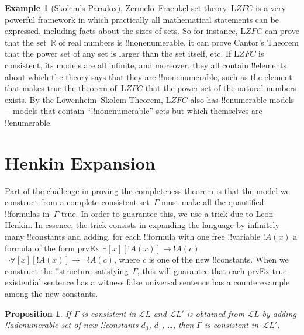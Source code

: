 \documentclass[10pt,a4paper]{article}
\theoremstyle{plain}
\newtheorem{prop}[thm]{Proposition}
\theoremstyle{definition}
\newtheorem{ex}[thm]{Example}
\theoremstyle{remark}
\newenvironment{explain}{}{}
\newcommand*{\olfileid}[3]{}
\newcommand*{\olsection}[1]{\section*{#1}}
\newcommand*{\ollabel}[1]{\label{#1}}
\providecommand{\lif}{\mathbin{\rightarrow}}
\providecommand{\lforall}{\mathord{\forall}}
\providecommand{\lexists}{\mathord{\exists}}
\providecommand{\Obj}{}
\providecommand{\Lang}{\ensuremath{\mathcal{L}}}
\providecommand{\Log}{\ensuremath{\mathrm{L}}}
\providecommand{\iftag}[1]{#1}
\providecommand{\Real}{\mathbb{R}}
\begin{document}
\begin{ex}[Skolem's Paradox]
Zermelo--Fraenkel set theory~$\Log{ZFC}$ is a very powerful framework
in which practically all mathematical statements can be expressed,
including facts about the sizes of sets. So for instance, $\Log{ZFC}$
can prove that the set~$\Real$ of real numbers is !!{nonenumerable},
it can prove Cantor's Theorem that the power set of any set is larger
than the set itself, etc.  If $\Log{ZFC}$ is consistent, its models
are all infinite, and moreover, they all contain !!{element}s about
which the theory says that they are !!{nonenumerable}, such as the
element that makes true the theorem of~$\Log{ZFC}$ that the power set
of the natural numbers exists. By the L\"owenheim--Skolem Theorem,
$\Log{ZFC}$ also has !!{enumerable} models---models that contain
``!!{nonenumerable}'' sets but which themselves are !!{enumerable}.
\end{ex}





\olfileid{fol}{com}{hen}

\olsection{Henkin Expansion}

\begin{explain}
Part of the challenge in proving the completeness theorem is that the
model we construct from a complete consistent set~$\Gamma$ must make
all the quantified !!{formula}s in~$\Gamma$ true.  In order to
guarantee this, we use a trick due to Leon Henkin.  In essence, the
trick consists in expanding the language by infinitely many !!{constant}s
and adding, for each !!{formula} with one free !!{variable} $!A(x)$ a
formula of the form
\iftag{prvEx}
      {$\lexists[x][!A(x)] \lif !A(c)$}
      {$\lnot\lforall[x][!A(x)] \lif \lnot !A(c)$},
where $c$ is one of the new !!{constant}s.  When we construct the
!!{structure} satisfying~$\Gamma$, this will guarantee that each
\iftag{prvEx}
{true existential sentence has a witness}
{false universal sentence has a counterexample}
among the new constants.
\end{explain}

\begin{prop}
\ollabel{prop:lang-exp}
If $\Gamma$ is consistent in $\Lang L$ and $\Lang L'$ is obtained from
$\Lang L$ by adding !!a{denumerable} set of new !!{constant}s $\Obj d_0$,
$\Obj d_1$, \dots, then $\Gamma$ is consistent in~$\Lang L'$.
\end{prop}
\end{document}
